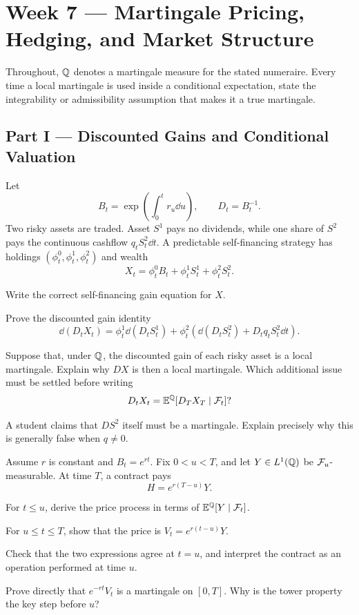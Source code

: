 \section{Week 7 --- Martingale Pricing, Hedging, and Market Structure}

Throughout, \(\mathbb{Q}\) denotes a martingale measure for the stated numeraire.
Every time a local martingale is used inside a conditional expectation,
state the integrability or admissibility assumption that makes it a true
martingale.

\subsection*{Part I --- Discounted Gains and Conditional Valuation}

\begin{exercise}
Let
\[
B_t=\exp\left(\int_0^t r_u\dd u\right),
\qquad D_t=B_t^{-1}.
\]
Two risky assets are traded. Asset \(S^1\) pays no dividends, while one share
of \(S^2\) pays the continuous cashflow \(q_tS_t^2\dd t\). A predictable
self-financing strategy has holdings
\((\phi_t^0,\phi_t^1,\phi_t^2)\) and wealth
\[
X_t=\phi_t^0B_t+\phi_t^1S_t^1+\phi_t^2S_t^2.
\]
\begin{exparts}
  \item Write the correct self-financing gain equation for \(X\).
  \item Prove the discounted gain identity
  \[
  \dd(D_tX_t)
  =\phi_t^1\dd(D_tS_t^1)
  +\phi_t^2\left(\dd(D_tS_t^2)+D_tq_tS_t^2\dd t\right).
  \]
  \item Suppose that, under \(\mathbb{Q}\), the discounted gain of each risky
  asset is a local martingale. Explain why \(DX\) is then a local martingale.
  Which additional issue must be settled before writing
  \[
  D_tX_t=\mathbb{E}^{\mathbb{Q}}[D_TX_T\mid\mathcal{F}_t]?
  \]
  \item A student claims that \(DS^2\) itself must be a martingale. Explain
  precisely why this is generally false when \(q\neq0\).
\end{exparts}
\end{exercise}

\begin{exercise}
Assume \(r\) is constant and \(B_t=e^{rt}\). Fix \(0<u<T\), and let
\(Y\in L^1(\mathbb{Q})\) be \(\mathcal{F}_u\)-measurable. At time \(T\), a contract pays
\[
H=e^{r(T-u)}Y.
\]
\begin{exparts}
  \item For \(t\leq u\), derive the price process in terms of
  \(\mathbb{E}^{\mathbb{Q}}[Y\mid\mathcal{F}_t]\).
  \item For \(u\leq t\leq T\), show that the price is
  \(V_t=e^{r(t-u)}Y\).
  \item Check that the two expressions agree at \(t=u\), and interpret the
  contract as an operation performed at time \(u\).
  \item Prove directly that \(e^{-rt}V_t\) is a martingale on \([0,T]\).
  Why is the tower property the key step before \(u\)?
\end{exparts}
\end{exercise}

